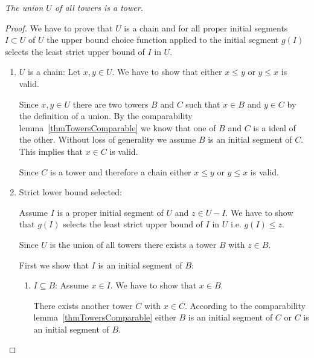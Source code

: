 \begin{lemma}
    \label{thmTowerUnion}
    \emph{
        The union $U$ of all towers is a tower.
    }

    \begin{proof}
        We have to prove that $U$ is a chain and for all proper initial segments
        $I \subset U$ of $U$ the upper bound choice function applied to the
        initial segment $g(I)$ selects the least strict upper bound of $I$ in
        $U$.

        \begin{enumerate}
            \item $U$ is a chain: Let $x,y \in U$. We have to show that either
            $x \le y$ or $y \le x$ is valid.

            Since $x,y \in U$ there are two towers $B$ and $C$ such that $x \in
            B$ and $y \in C$ by the definition of a union. By the comparability
            lemma~\ref{thmTowersComparable} we know that one of $B$ and $C$ is a
            ideal of the other. Without loss of generality we assume $B$ is an
            initial segment of $C$. This implies that $x \in C$ is valid.

            Since $C$ is a tower and therefore a chain either $x \le y$ or $y
            \le x$ is valid.


            \item Strict lower bound selected:

                Assume $I$ is a proper initial segment of $U$ and $z \in U - I$.
                We have to show that $g(I)$ selects the least strict upper bound
                of $I$ in $U$ i.e. $g(I) \le z$.

                Since $U$ is the union of all towers there exists a tower $B$
                with $z \in B$.

                First we show that $I$ is an initial segment of $B$:
                \begin{enumerate}
                    \item $I \subseteq B$: Assume $x \in I$. We have to show
                        that $x \in B$.

                        There exists another tower $C$ with $x \in C$. According
                        to the comparability lemma~\ref{thmTowersComparable}
                        either $B$ is an initial segment of $C$ or $C$ is an
                        initial segment of $B$.


\end{enumerate}
\end{enumerate}
\end{proof}
\end{lemma}
